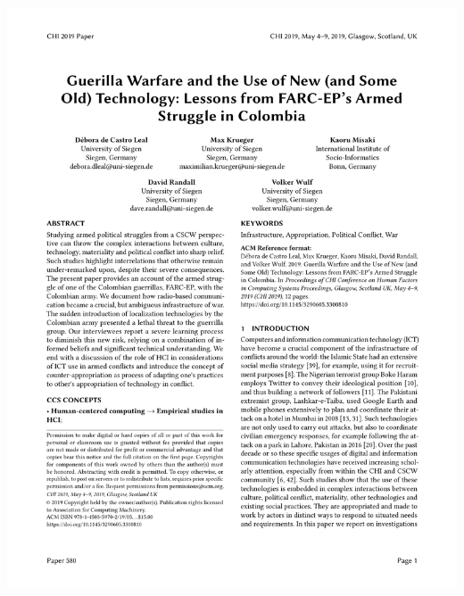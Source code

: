 \documentclass[aspectratio=169,10pt]{beamer} %
\begin{document}
\begin{frame}[t] %
\includegraphics[width=\textwidth]{pdfs/guerilla_warfare.pdf}
\end{frame}
\end{document}
